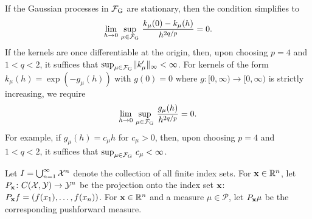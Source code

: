 \documentclass[12pt]{report}
\begin{document}
If the Gaussian processes in $\F\ss{G}$ are stationary, then the condition simplifies to
\begin{equation}
    \lim_{h \to 0}\,
    \sup_{\mu \in \F\ss{G}}\,
    \frac{
        k_\mu(0)
        - k_\mu(h)
    }{h^{2q/p}}
    = 0.
\end{equation}
If the kernels are once differentiable at the origin, then, upon choosing $p = 4$ and $1 < q < 2$, it suffices that $\sup_{\mu \in \F\ss{G}} \norm{k'_\mu}_\infty < \infty$.
For kernels of the form $k_\mu(h) = \exp(-g_\mu(h))$ with $g(0) = 0$ where $g \colon [0, \infty) \to [0, \infty)$ is strictly increasing, we require 
\begin{equation}
    \lim_{h \to 0}\,
    \sup_{\mu \in \F\ss{G}}\,
    \frac{
        g_\mu(h)
    }{h^{2q/p}}
    = 0.
\end{equation}
For example, if $g_\mu(h) = c_\mu h$ for $c_\mu > 0$, then, upon choosing $p = 4$ and $1 < q < 2$, it suffices that $\sup_{\mu \in \F\ss{G}}\, c_\mu < \infty$.

Let $I = \bigcup_{n=1}^\infty \mathcal{X}^n$ denote the collection of all finite index sets.
For $\mathbf{x} \in \mathbb{R}^n$, let $P_{\mathbf{x}}\colon C(\mathcal{X}, \mathcal{Y}) \to \mathcal{Y}^n$ be the projection onto the index set $\mathbf{x}$: $P_{\mathbf{x}} f = (f(x_1), \ldots, f(x_n))$.
For $\mathbf{x} \in \mathbb{R}^n$ and a measure $\mu \in \mathcal{P}$, let $P_{\mathbf{x}} \mu$ be the corresponding pushforward measure.
\end{document}
